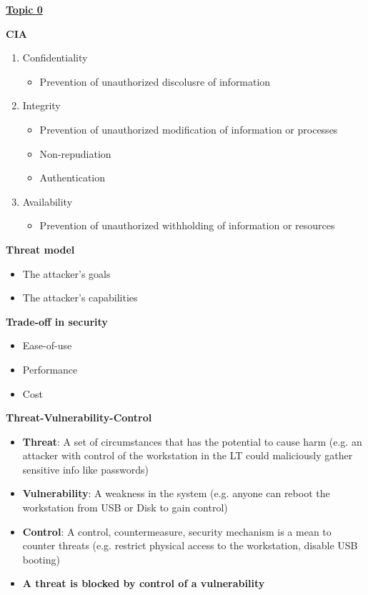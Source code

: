 \documentclass[landscape,a4paper]{extarticle}
\begin{document}
\fontsize{7}{8}\selectfont
{}\selectfont
\begin{multicols*}{5}
	\textbf{\uline{Topic 0}}

	\textbf{CIA}
	\begin{enumerate}
		\item Confidentiality
		      \begin{itemize}
			      \item Prevention of unauthorized discolusre of information
		      \end{itemize}
		\item Integrity
		      \begin{itemize}
			      \item Prevention of unauthorized modification of information or processes
			      \item Non-repudiation
			      \item Authentication
		      \end{itemize}
		\item Availability
		      \begin{itemize}
			      \item Prevention of unauthorized withholding of information or resources
		      \end{itemize}
	\end{enumerate}
	\textbf{Threat model}

	\begin{itemize}
		\item The attacker's goals
		\item The attacker's capabilities
	\end{itemize}

	\textbf{Trade-off in security}
	\begin{itemize}
		\item Ease-of-use
		\item Performance
		\item Cost
	\end{itemize}

	\textbf{Threat-Vulnerability-Control}
	\begin{itemize}
		\item \textbf{Threat}: A set of circumstances that has the potential to cause harm (e.g. an
        attacker with control of the workstation in the LT could maliciously gather
        sensitive info like passwords)
        \item \textbf{Vulnerability}: A weakness in the system (e.g. anyone can reboot the
        workstation from USB or Disk to gain control)
        \item \textbf{Control}: A control, countermeasure, security mechanism is a mean to counter threats
        (e.g. restrict physical access to the workstation, disable USB booting)
        \item \textbf{A threat is blocked by control of a vulnerability}
	\end{itemize}
    

\end{multicols*}
\end{document}

